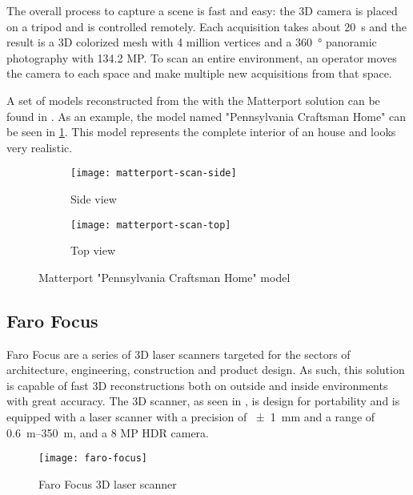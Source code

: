 The overall process to capture a scene is fast and easy: the 3D camera is placed on a tripod and is controlled remotely. Each acquisition takes about \SI{20}{\second} and the result is a 3D colorized mesh with 4 million vertices and a \SI{360}{\degree} panoramic photography with 134.2 MP. To scan an entire environment, an operator moves the camera to each space and make multiple new acquisitions from that space.

A set of models reconstructed from the with the Matterport solution can be found in \cite{matterport-gallery}. As an example, the model named "Pennsylvania Craftsman Home" \cite{matterport-house} can be seen in \cref{fig:matterport-model}. This model represents the complete interior of an house and looks very realistic.

\begin{figure}[h]
    
    \centering
    \begin{subfigure}{\textwidth}
        \centering
        \texttt{[image: matterport-scan-side]}
        \caption{Side view}
    \end{subfigure}

    \begin{subfigure}{\textwidth}
        \centering
        \texttt{[image: matterport-scan-top]}
        \caption{Top view}
    \end{subfigure}

    \caption{Matterport "Pennsylvania Craftsman Home" model}
    \label{fig:matterport-model}
\end{figure}

\subsection{Faro Focus}

Faro Focus \cite{faro-focus} are a series of 3D laser scanners targeted for the sectors of architecture, engineering, construction and product design. As such, this solution is capable of fast 3D reconstructions both on outside and inside environments with great accuracy. The 3D scanner, as seen in , is design for portability and is equipped with a laser scanner with a precision of \SI{+-1}{\milli\meter} and a range of \SIrange{0.6}{350}{\meter}, and a 8 MP HDR camera.

\begin{figure}[h]
    \centering
    \texttt{[image: faro-focus]}
    \caption{Faro Focus 3D laser scanner}
    \label{fig:faro-focus}
\end{figure}

